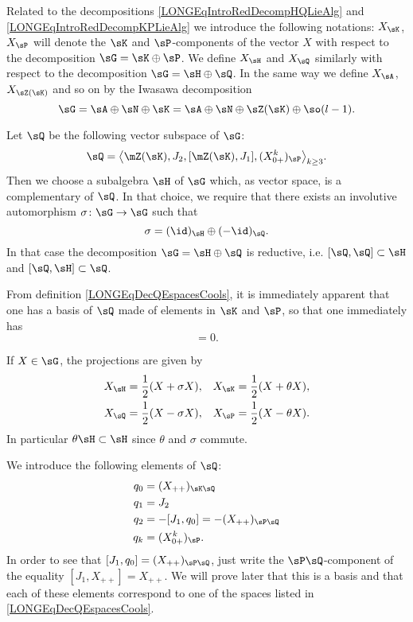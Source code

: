 Related to the decompositions \eqref{LONGEqIntroRedDecompHQLieAlg} and \eqref{LONGEqIntroRedDecompKPLieAlg} we introduce the following notations: $X_{\sK}$, $X_{\sP}$ will denote the $\sK$ and $\sP$-components of the vector $X$ with respect to the decomposition $\sG=\sK\oplus\sP$. We define $X_{\sH}$ and $X_{\sQ}$ similarly with respect to the decomposition $\sG=\sH\oplus\sQ$. In the same way we define $X_{\sA}$, $X_{\sZ(\sK)}$ and so on by the Iwasawa decomposition
\begin{equation}
	\sG=\sA\oplus\sN\oplus\sK=\sA\oplus\sN\oplus\sZ(\sK)\oplus\so(l-1).
\end{equation}

Let $\sQ$ be the following vector subspace of $\sG$:
\begin{equation}		\label{LONGEqDecQEspacesCools}	%
	\sQ=\big\langle \mZ(\sK),J_2,[\mZ(\sK),J_1],(X_{0+}^k)_\sP\big\rangle_{k\geq 3}.
\end{equation}
Then we choose a subalgebra $\sH$ of $\sG$ which, as vector space, is a complementary of $\sQ$. In that choice, we require that there exists an involutive automorphism $\sigma\colon \sG\to \sG$ such that
\begin{equation}
	\sigma=(\id)_{\sH}\oplus(-\id)_{\sQ}.
\end{equation}
In that case the decomposition $\sG=\sH\oplus\sQ$ is reductive, i.e. $[\sQ,\sQ]\subset\sH$ and $[\sQ,\sH]\subset\sQ$.




From definition \eqref{LONGEqDecQEspacesCools}, it is immediately apparent that one has a basis of $\sQ$ made of elements in $\sK$ and $\sP$, so that one immediately has
\begin{equation}
	[\sigma,\theta]=0.
\end{equation}

If $X\in\sG$, the projections are given by
\begin{equation}		\label{LONGEqProjHQPKsigmatheta}
	\begin{aligned}[]
		X_{\sH} & =\frac{ 1 }{2}(X+\sigma X), & X_{\sK} & =\frac{ 1 }{2}(X+\theta X), \\
		X_{\sQ} & =\frac{ 1 }{2}(X-\sigma X), & X_{\sP} & =\frac{ 1 }{2}(X-\theta X).
	\end{aligned}
\end{equation}
In particular $\theta\sH\subset\sH$ since $\theta$ and $\sigma$ commute.

We introduce the following elements of $\sQ$:
\begin{equation}			\label{LONGAlignPRedDefQQ}
	\begin{aligned}[]
		q_0 & =(X_{++})_{\sK\sQ}             \\
		q_1 & =J_2                           \\
		q_2 & =-[J_1,q_0]=-(X_{++})_{\sP\sQ} \\
		q_k & =(X^k_{0+})_{\sP}.
	\end{aligned}
\end{equation}
In order to see that $[J_1,q_0]=(X_{++})_{\sP\sQ}$, just write the $\sP\sQ$-component of the equality $[J_1,X_{++}]=X_{++}$. We will prove later that this is a basis and that each of these elements correspond to one of the spaces listed in \eqref{LONGEqDecQEspacesCools}.

